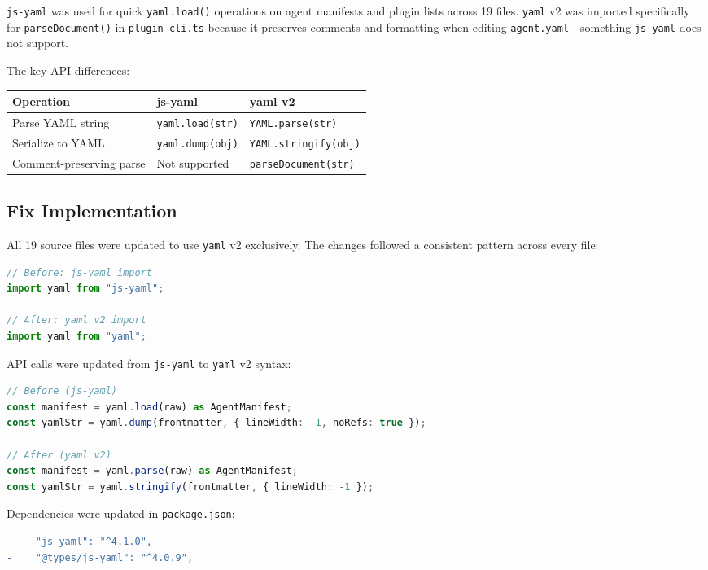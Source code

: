\texttt{js-yaml} was used for quick \texttt{yaml.load()} operations on agent manifests and plugin lists across 19 files. \texttt{yaml} v2 was imported specifically for \texttt{parseDocument()} in \texttt{plugin-cli.ts} because it preserves comments and formatting when editing \texttt{agent.yaml}---something \texttt{js-yaml} does not support.

The key API differences:

\begin{tabular}{lll}
\textbf{Operation} & \textbf{js-yaml} & \textbf{yaml v2} \\
\hline
Parse YAML string & \texttt{yaml.load(str)} & \texttt{YAML.parse(str)} \\
Serialize to YAML & \texttt{yaml.dump(obj)} & \texttt{YAML.stringify(obj)} \\
Comment-preserving parse & Not supported & \texttt{parseDocument(str)} \\
\end{tabular}

\subsection*{Fix Implementation}

All 19 source files were updated to use \texttt{yaml} v2 exclusively. The changes followed a consistent pattern across every file:

\begin{lstlisting}[language=TypeScript]
// Before: js-yaml import
import yaml from "js-yaml";

// After: yaml v2 import
import yaml from "yaml";
\end{lstlisting}

API calls were updated from \texttt{js-yaml} to \texttt{yaml} v2 syntax:

\begin{lstlisting}[language=TypeScript]
// Before (js-yaml)
const manifest = yaml.load(raw) as AgentManifest;
const yamlStr = yaml.dump(frontmatter, { lineWidth: -1, noRefs: true });

// After (yaml v2)
const manifest = yaml.parse(raw) as AgentManifest;
const yamlStr = yaml.stringify(frontmatter, { lineWidth: -1 });
\end{lstlisting}

Dependencies were updated in \texttt{package.json}:

\begin{lstlisting}[language=diff]
-    "js-yaml": "^4.1.0",
-    "@types/js-yaml": "^4.0.9",
\end{lstlisting}

